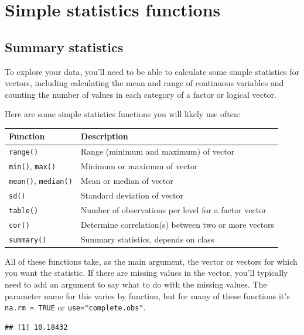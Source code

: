 \documentclass[]{book}
\makeatletter
\newenvironment{Shaded}{\begin{snugshade}}{\end{snugshade}}
\newcommand{\KeywordTok}[1]{\textcolor[rgb]{0.13,0.29,0.53}{\textbf{#1}}}
\newcommand{\DataTypeTok}[1]{\textcolor[rgb]{0.13,0.29,0.53}{#1}}
\newcommand{\OtherTok}[1]{\textcolor[rgb]{0.56,0.35,0.01}{#1}}
\newcommand{\OperatorTok}[1]{\textcolor[rgb]{0.81,0.36,0.00}{\textbf{#1}}}
\newcommand{\NormalTok}[1]{#1}
\newenvironment{kframe}{%
\medskip{}
\setlength{\fboxsep}{.8em}
 \def\at@end@of@kframe{}%
 \ifinner\ifhmode%
  \def\at@end@of@kframe{\end{minipage}}%
  \begin{minipage}{\columnwidth}%
 \fi\fi%
 \def\FrameCommand##1{\hskip\@totalleftmargin \hskip-\fboxsep
 \colorbox{shadecolor}{##1}\hskip-\fboxsep
     \hskip-\linewidth \hskip-\@totalleftmargin \hskip\columnwidth}%
 \MakeFramed {\advance\hsize-\width
   \@totalleftmargin\z@ \linewidth\hsize
   \@setminipage}}%
 {\par\unskip\endMakeFramed%
 \at@end@of@kframe}
\renewenvironment{Shaded}{\begin{kframe}}{\end{kframe}}
\theoremstyle{definition}
\theoremstyle{definition}
\theoremstyle{definition}
\theoremstyle{remark}
\makeatother
\begin{document}
\section{Simple statistics functions}\label{simple-statistics-functions}

\subsection{Summary statistics}\label{summary-statistics}

To explore your data, you'll need to be able to calculate some simple
statistics for vectors, including calculating the mean and range of
continuous variables and counting the number of values in each category
of a factor or logical vector.

Here are some simple statistics functions you will likely use often:

\begin{longtable}[]{@{}ll@{}}
\toprule
Function & Description\tabularnewline
\midrule
\endhead
\texttt{range()} & Range (minimum and maximum) of vector\tabularnewline
\texttt{min()}, \texttt{max()} & Minimum or maximum of
vector\tabularnewline
\texttt{mean()}, \texttt{median()} & Mean or median of
vector\tabularnewline
\texttt{sd()} & Standard deviation of vector\tabularnewline
\texttt{table()} & Number of observations per level for a factor
vector\tabularnewline
\texttt{cor()} & Determine correlation(s) between two or more
vectors\tabularnewline
\texttt{summary()} & Summary statistics, depends on class\tabularnewline
\bottomrule
\end{longtable}

All of these functions take, as the main argument, the vector or vectors
for which you want the statistic. If there are missing values in the
vector, you'll typically need to add an argument to say what to do with
the missing values. The parameter name for this varies by function, but
for many of these functions it's \texttt{na.rm\ =\ TRUE} or
\texttt{use="complete.obs"}.

\begin{Shaded}
\end{Shaded}

\begin{verbatim}
## [1] 10.18432
\end{verbatim}
\end{document}
